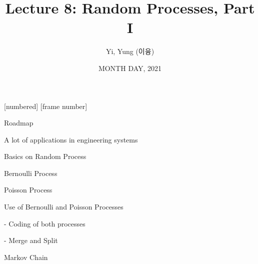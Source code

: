 

\csname\pdfmode\endcsname

{
  [numbered]
  [frame number]  %
} 





\title[]{Lecture 8: Random Processes, Part I}
\author{Yi, Yung (이융)}
\date{MONTH DAY, 2021}








\begin{frame}
  \titlepage
\end{frame}




\begin{frame}{Roadmap}

\plitemsep 0.1in

\bci 
\item A lot of applications in engineering systems


\bigskip

\item Basics on Random Process

\medskip
\item Bernoulli Process
\item Poisson Process
\item Use of Bernoulli and Poisson Processes

- Coding of both processes

- Merge and Split

\medskip
\item Markov Chain

\eci 

\end{frame}

